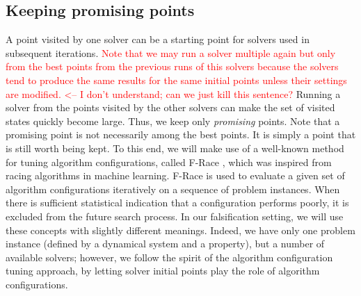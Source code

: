 \subsection{Keeping promising points}
A point visited by one solver can be a starting point for solvers used in subsequent iterations. \textcolor{red}{Note that we may run a solver multiple again but only from the best points from the previous runs of this solvers because the solvers tend to produce the same results for the same initial points unless their settings are modified. <-- I don't understand; can we just kill this sentence?} Running a solver from the points visited by the other solvers can make the set of visited states quickly become large. Thus, we keep only {\em promising} points. Note that a promising point is not necessarily among the best points. It is simply a point that is still worth being kept. To this end, we will make use of a well-known method for tuning algorithm configurations, called F-Race \cite{Birattari2010}, which was inspired from racing algorithms in machine learning. F-Race is used to evaluate a given set of algorithm configurations iteratively on a sequence of problem instances. When there is sufficient statistical indication that a configuration performs poorly, it is excluded from the future search process. %
In our falsification setting, we will use these concepts with slightly different meanings. Indeed, we have only one problem instance (defined by a dynamical system and a property), but a number of available solvers; however, we follow the spirit of the algorithm configuration tuning approach, by letting solver initial points play the role of algorithm configurations.

